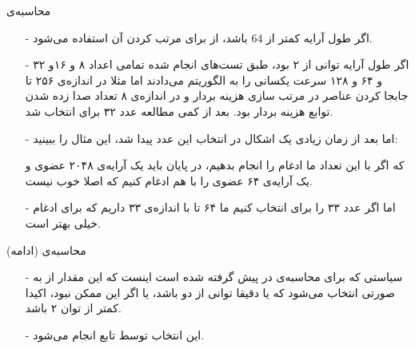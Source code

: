 \begin{frame}{محاسبه‌ی }
\begin{itemize}\itemr
\item[-]
اگر طول آرایه‌ کمتر از 64 باشد، از 
برای مرتب کردن آن استفاده می‌شود.

\item[-]
اگر طول آرایه توانی از ۲ بود، طبق تست‌های انجام شده تمامی اعداد ۸ و ۱۶و ۳۲ و ۶۴ و ۱۲۸ سرعت یکسانی را به الگوریتم می‌دادند اما مثلا در اندازه‌ی ۲۵۶ تا جابجا کردن عناصر در مرتب ‌سازی هزینه بردار و در انداز‌ه‌ی ۸ تعداد صدا زده شدن توابع هزینه‌ بردار بود. بعد از کمی مطالعه عدد ۳۲ برای  انتخاب شد.

\item[-]
اما بعد از زمان زیادی یک اشکال در انتخاب این عدد پیدا شد، این مثال را ببینید:
\begin{flushleft}
\end{flushleft}
که اگر با این تعداد  ما ادغام را انجام بدهیم، در پایان باید یک آرایه‌ی ۲۰۴۸ عضوی و یک آرایه‌ی ۶۴ عضوی را با هم ادغام کنیم که اصلا خوب نیست.

\item[-]
اما اگر عدد ۳۳ را برای  انتخاب کنیم ما ۶۴ تا  با اندازه‌ی ۳۳ داریم که برای ادغام خیلی بهتر است.
\end{itemize}
\end{frame}

\begin{frame}[fragile]{محاسبه‌ی  (ادامه)}
\begin{itemize}\itemr
\item[-]
سیاستی که برای محاسبه‌ی  در پیش گرفته شده است اینست که این مقدار از  به صورتی انتخاب می‌شود که  یا دقیقا توانی از دو باشد، یا اگر این ممکن نبود، اکیدا کمتر از توان ۲ باشد.

\item[-]
این انتخاب توسط تابع
انجام می‌شود.
\end{itemize}
\end{frame}
